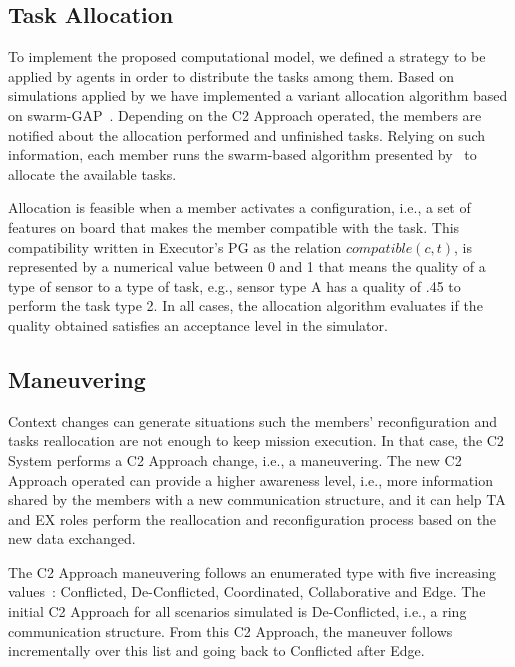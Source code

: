 


\subsection{Task Allocation}

To implement the proposed computational model, we defined a strategy to be applied by agents in order to distribute the tasks among them. Based on simulations applied by \cite{UAV01} we have implemented a variant allocation algorithm based on swarm-GAP~\cite{Schwarzrock2017}. Depending on the C2 Approach operated, the members are notified about the allocation performed and unfinished tasks. Relying on such information, each member runs the swarm-based algorithm presented by~\cite{UAV01} to allocate the available tasks.

Allocation is feasible when a member activates a configuration, i.e., a set of features on board that makes the member compatible with the task. This compatibility written in Executor's PG as the relation $compatible(c,t)$, is represented by a numerical value between 0 and 1 that means the quality of a type of sensor to a type of task, e.g., sensor type A has a quality of .45 to perform the task type 2. In all cases, the allocation algorithm evaluates if the quality obtained satisfies an acceptance level in the simulator.


\subsection{Maneuvering}

Context changes can generate situations such the members' reconfiguration and tasks reallocation are not enough to keep mission execution. In that case, the C2 System performs a C2 Approach change, i.e., a maneuvering. The new C2 Approach operated can provide a higher awareness level, i.e., more information shared by the members with a new communication structure, and it can help TA and EX roles perform the reallocation and reconfiguration process based on the new data exchanged. 

The C2 Approach maneuvering follows an enumerated type with five increasing values~\cite{nato01}: Conflicted, De-Conflicted, Coordinated, Collaborative and Edge. The initial C2 Approach for all scenarios simulated is De-Conflicted, i.e., a ring communication structure. From this C2 Approach, the maneuver follows incrementally over this list and going back to Conflicted after Edge.

